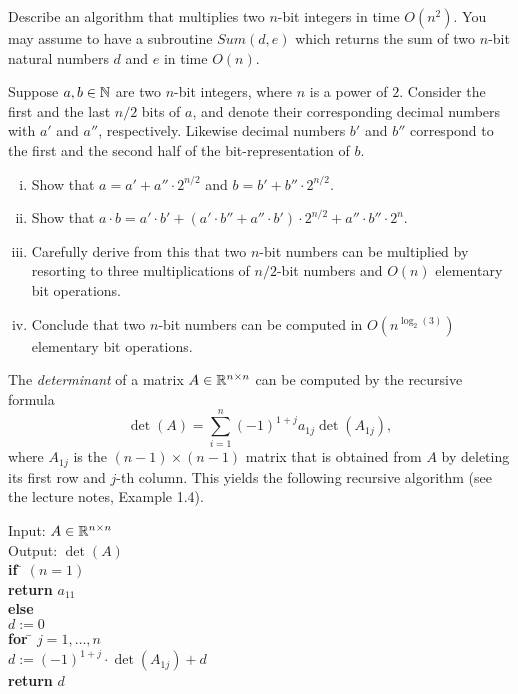\documentclass[11pt]{article}
\institute{\'Ecole Polytechnique F\'ed\'erale de Lausanne}
\begin{document}
\makeheader


\problem
Describe an algorithm that multiplies two $n$-bit integers in time $O(n^2)$. You may assume to have a subroutine $Sum(d,e)$ which returns the sum of two $n$-bit natural numbers $d$ and $e$ in time $O(n)$.
 
\problem Suppose $a,b \in \mathbb{N}$ are two $n$-bit integers, where $n$ is a power of $2$. Consider the first and the last $n/2$ bits of $a$, and denote their corresponding decimal numbers with $a'$ and $a''$, respectively. Likewise decimal numbers $b'$ and $b''$ correspond to the first and the second half of the bit-representation of $b$. 
  \begin{enumerate}[i)]
  \item Show that $a = a' + a'' \cdot 2^{n/2}$ and  $b = b' + b'' \cdot 2^{n/2}$.
  \item Show that $a \cdot b = a' \cdot b' + (a' \cdot b'' + a'' \cdot b') \cdot 2^{n/2} + a'' \cdot b'' \cdot 2^n $. 
  \item Carefully derive from this  that two $n$-bit
    numbers can be multiplied by resorting to three multiplications of
    $n/2$-bit numbers and $O(n)$ elementary bit operations.
  \item Conclude that two $n$-bit
    numbers can be computed in $O(n^{\log_2(3)})$
    elementary bit operations.
  \end{enumerate}
  
\problem 
The \emph{determinant} of a matrix $A \in \mathbb{R}^{n \times n}$ can be computed by the recursive formula 
\begin{displaymath}
  \det(A) = \sum_{i=1}^n (-1)^{1+j}a_{1j} \det(A_{1j}),
\end{displaymath}
where $A_{1j}$ is the $(n-1)×(n-1)$ matrix that is obtained from $A$ by deleting its first row and $j$-th column.  This yields the following recursive algorithm (see the lecture notes, Example 1.4). 

\begin{tabbing}
  Input: $A \in \mathbb{R}^{n \times n}$ \\
  Output: $\det(A)$ \\
  
  {\bf if} \= $(n=1)$ \\
           \> {\bf return} $a_{11}$ \\
  {\bf else} \\
           \> $d:=0$  \\
           \> {\bf for } \= $j=1,\dots,n$ \\
           \>            \> $d:= (-1)^{1+j}⋅ \det(A_{1j}) +d$\\
           \> {\bf return} $d$   
\end{tabbing}
\end{document}
